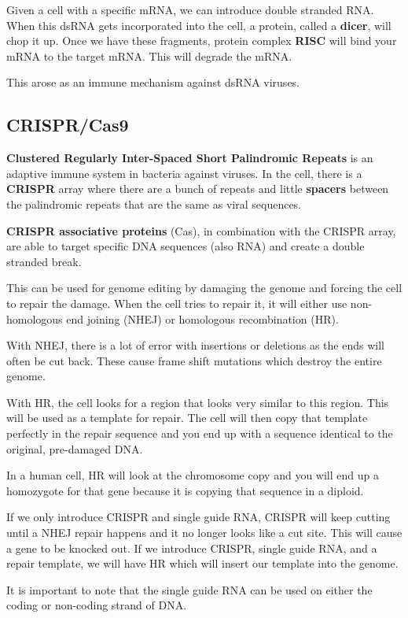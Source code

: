 \documentclass{article}
\begin{document}
Given a cell with a specific mRNA, we can introduce double stranded RNA. When this dsRNA gets incorporated into the cell, a protein, called a \textbf{dicer}, will chop it up. Once we have these fragments, protein complex \textbf{RISC} will bind your mRNA to the target mRNA. This will degrade the mRNA.

This arose as an immune mechanism against dsRNA viruses.

\subsection{CRISPR/Cas9}

\textbf{Clustered Regularly Inter-Spaced Short Palindromic Repeats} is an adaptive immune system in bacteria against viruses. In the cell, there is a \textbf{CRISPR} array where there are a bunch of repeats and little \textbf{spacers} between the palindromic repeats that are the same as viral sequences.

\textbf{CRISPR associative proteins} (Cas), in combination with the CRISPR array, are able to target specific DNA sequences (also RNA) and create a double stranded break.

This can be used for genome editing by damaging the genome and forcing the cell to repair the damage. When the cell tries to repair it, it will either use non-homologous end joining (NHEJ) or homologous recombination (HR). 

With NHEJ, there is a lot of error with insertions or deletions as the ends will often be cut back. These cause frame shift mutations which destroy the entire genome. 

With HR, the cell looks for a region that looks very similar to this region. This will be used as a template for repair. The cell will then copy that template perfectly in the repair sequence and you end up with a sequence identical to the original, pre-damaged DNA.

In a human cell, HR will look at the chromosome copy and you will end up a homozygote for that gene because it is copying that sequence in a diploid. 

If we only introduce CRISPR and single guide RNA, CRISPR will keep cutting until a NHEJ repair happens and it no longer looks like a cut site. This will cause a gene to be knocked out. If we introduce CRISPR, single guide RNA, and a repair template, we will have HR which will insert our template into the genome.

It is important to note that the single guide RNA can be used on either the coding or non-coding strand of DNA.
\end{document}
